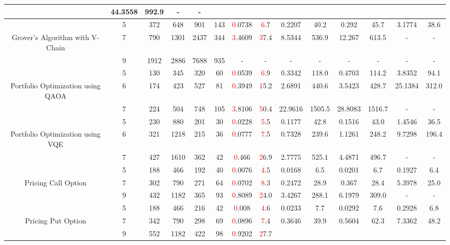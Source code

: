 \begin{table}[htb]
{\begin{tabular}{|c|c|c|c|c|c|c|c|c|c|c|c|c|c|}
 & 44.3558 & 992.9
 & - & -
 \\
\hline
 & 
5 & 372 & 648 & 901 & 143
 & \textcolor{red}0.0738 & \textcolor{red}6.7
 & 0.2207 & 40.2
 & 0.292 & 45.7
 & 3.1774 & 38.6
 \\
Grover's Algorithm with V-Chain & 
7 & 790 & 1301 & 2437 & 344
 & \textcolor{red}3.4609 & \textcolor{red}37.4
 & 8.5344 & 536.9
 & 12.267 & 613.5
 & - & -
 \\
 & 
9 & 1912 & 2886 & 7688 & 935
 & - & -
 & - & -
 & - & -
 & - & -
 \\
\hline
 & 
5 & 130 & 345 & 320 & 60
 & \textcolor{red}0.0539 & \textcolor{red}6.9
 & 0.3342 & 118.0
 & 0.4703 & 114.2
 & 3.8352 & 94.1
 \\
Portfolio Optimization using QAOA & 
6 & 174 & 423 & 527 & 81
 & \textcolor{red}0.3949 & \textcolor{red}15.2
 & 2.6891 & 440.6
 & 3.5423 & 428.7
 & 25.1384 & 312.0
 \\
 & 
7 & 224 & 504 & 748 & 105
 & \textcolor{red}3.8106 & \textcolor{red}50.4
 & 22.9616 & 1505.5
 & 28.8083 & 1516.7
 & - & -
 \\
\hline
 & 
5 & 230 & 880 & 201 & 30
 & \textcolor{red}0.0228 & \textcolor{red}5.5
 & 0.1177 & 42.8
 & 0.1516 & 43.0
 & 1.4546 & 36.5
 \\
Portfolio Optimization using VQE & 
6 & 321 & 1218 & 215 & 36
 & \textcolor{red}0.0777 & \textcolor{red}7.5
 & 0.7328 & 239.6
 & 1.1261 & 248.2
 & 9.7298 & 196.4
 \\
 & 
7 & 427 & 1610 & 362 & 42
 & \textcolor{red}0.466 & \textcolor{red}26.9
 & 2.7775 & 525.1
 & 4.4871 & 496.7
 & - & -
 \\
\hline
 & 
5 & 188 & 466 & 192 & 40
 & \textcolor{red}0.0076 & \textcolor{red}4.5
 & 0.0168 & 6.5
 & 0.0201 & 6.7
 & 0.1927 & 6.4
 \\
Pricing Call Option & 
7 & 302 & 790 & 271 & 64
 & \textcolor{red}0.0702 & \textcolor{red}8.3
 & 0.2472 & 28.9
 & 0.367 & 28.4
 & 5.3978 & 25.0
 \\
 & 
9 & 432 & 1182 & 365 & 93
 & \textcolor{red}0.8089 & \textcolor{red}24.0
 & 3.4267 & 288.1
 & 6.1979 & 309.0
 & - & -
 \\
\hline
 & 
5 & 188 & 466 & 216 & 42
 & \textcolor{red}0.008 & \textcolor{red}4.6
 & 0.0233 & 7.7
 & 0.0292 & 7.6
 & 0.2928 & 6.8
 \\
Pricing Put Option & 
7 & 342 & 790 & 298 & 69
 & \textcolor{red}0.0896 & \textcolor{red}7.4
 & 0.3646 & 39.9
 & 0.5604 & 62.3
 & 7.3362 & 48.2
 \\
 & 
9 & 552 & 1182 & 422 & 98
 & \textcolor{red}0.9202 & \textcolor{red}27.7

\end{tabular}}
\end{table}
